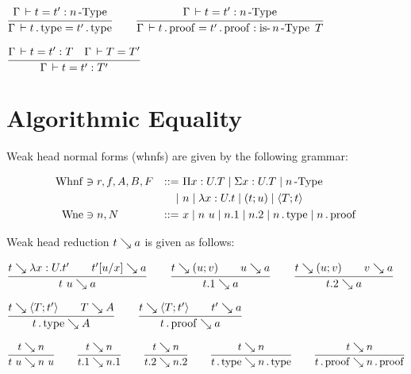 \documentclass[a4paper,english]{lipics-utf8x}
\begin{document}
  \begin{center}
  \(
    \ru{\Gamma \der t = t' : \nType{n}
      }{\Gamma \der t \gettype = t' \gettype}
    \qquad
    \ru{\Gamma \der t = t' : \nType{n}
      }{\Gamma \der t \getproof = t' \getproof : \isnType{n}{T}}
  \)
  \end{center}


  \begin{center}
  \(
    \ru{\Gamma \der t = t' : T \quad
        \Gamma \der T = T'
      }{\Gamma \der t = t' : T'}
  \)
  \end{center}

  \section{Algorithmic Equality}


  Weak head normal forms (whnfs) are given by the following grammar:

  \begin{align*}
    \operatorname{Whnf} &\ni r,f,A,B,F &::=~&  \Pi x:U.T \mid \Sigma x:U.T \mid
                                 n\operatorname{-Type} \\
        &&\mid~& n \mid \lambda x:U.t \mid (t;u) \mid \langle T;t \rangle \\
    \operatorname{Wne}  &\ni n,N &::=~& x \mid n~u \mid n.1 \mid n.2
               \mid n \operatorname{.type} \mid n \operatorname{.proof}
  \end{align*}

  Weak head reduction $t \searrow a$ is given as follows:

  \begin{center}
  \(
    \ru{t \rew \lambda x:U.t' \qquad
        t'[u/x] \rew a
      }{t~u \rew a}
    \qquad
    \ru{t \rew (u;v) \qquad
        u \rew a
      }{t.1 \rew a}
    \qquad
    \ru{t \rew (u;v) \qquad
        v \rew a
      }{t.2 \rew a}
  \)
  \end{center}

  \begin{center}
  \(
    \ru{t \rew \hsig{T;t'} \qquad
        T \rew A
      }{t \gettype \rew A}
    \qquad
    \ru{t \rew \hsig{T;t'} \qquad
        t' \rew a
      }{t \getproof \rew a}
  \)
  \end{center}

  \begin{center}
  \(
    \ru{t \rew n
      }{t~u \rew n~u}
    \qquad
    \ru{t \rew n
      }{t.1 \rew n.1}
    \qquad
    \ru{t \rew n
      }{t.2 \rew n.2}
    \qquad
    \ru{t \rew n
      }{t \gettype \rew n \gettype}
    \qquad
    \ru{t \rew n
      }{t \getproof \rew n \getproof}
  \)
  \end{center}
\end{document}
